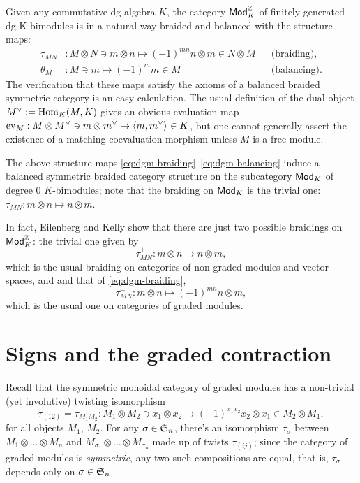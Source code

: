 Given any commutative dg-algebra $K$, the category $\mathsf{Mod}_K^{\mathbb{Z}}$ of
finitely-generated dg-K-bimodules is in a natural way braided and
balanced with the structure maps:
\begin{align}
  \label{eq:dgm-braiding}
  \tau_{MN} &: M \otimes N \ni m\otimes n \mapsto (-1)^{mn}n\otimes m \in N \otimes M
  &&
  \text{(braiding),}
  \\
  \label{eq:dgm-balancing}
  \theta_M &: M \ni m \mapsto (-1)^mm \in M
  &&
  \text{(balancing).}
\end{align}
The verification that these maps satisfy the axioms of a balanced
braided symmetric category is an easy calculation.  The usual
definition of the dual object $\rdl{M} := \Hom_K(M, K)$ gives an
obvious evaluation map $\ev_M : M \otimes \rdl{M} \ni m \otimes \rdl{m} \mapsto
\pairing{m}{\rdl{m}} \in K$, but one cannot generally assert the
existence of a matching coevaluation morphism unless $M$ is a free
module.

The above structure maps
\eqref{eq:dgm-braiding}--\eqref{eq:dgm-balancing} induce a balanced
symmetric braided category structure on the subcategory $\mathsf{Mod}_K$ of
degree $0$ $K$-bimodules; note that the braiding on $\mathsf{Mod}_K$ is the
trivial one: $\tau_{MN}: m\otimes n \mapsto n\otimes m$.
\begin{remark}
  In fact, Eilenberg and Kelly \cite{eilenberg-kelly;monoidal-categories}
  show that there are just two possible braidings on $\mathsf{Mod}_K^{\mathbb{Z}}$:
  the trivial one given by
  \begin{equation*}
    \tau_{MN}^+ : m\otimes n \mapsto n\otimes m,
  \end{equation*}
  which is the usual braiding on categories of non-graded modules and
  vector spaces, and and that of \eqref{eq:dgm-braiding},
  \begin{equation*}
    \tau_{MN}^- : m\otimes n \mapsto (-1)^{mn} n\otimes m,
  \end{equation*}
  which is the usual one on categories of graded modules.
\end{remark}


\section{Signs and the graded contraction}
\label{sec:signs}

Recall that the symmetric monoidal category of graded modules has a
non-trivial (yet involutive) twisting isomorphism
\begin{equation*}
\tau_{(12)} = \tau_{M_1M_2} : M_1
\otimes M_2 \ni x_1\otimes x_2 \mapsto (-1)^{x_1x_2} x_2\otimes x_1
\in M_2\otimes M_1,
\end{equation*}
for all objects $M_1$, $M_2$. For any
$\sigma\in\mathfrak{S}_{n}$, there's an isomorphism $\tau_\sigma$ between
$M_1\otimes \dots \otimes M_n$ and $M_{\sigma_1} \otimes \dots
\otimes M_{\sigma_n}$ made up of twists $\tau_{(ij)}$; since the
category of graded modules is \emph{symmetric}, any two such
compositions are equal, that is, $\tau_\sigma$ depends only on
$\sigma\in\mathfrak{S}_{n}$.

